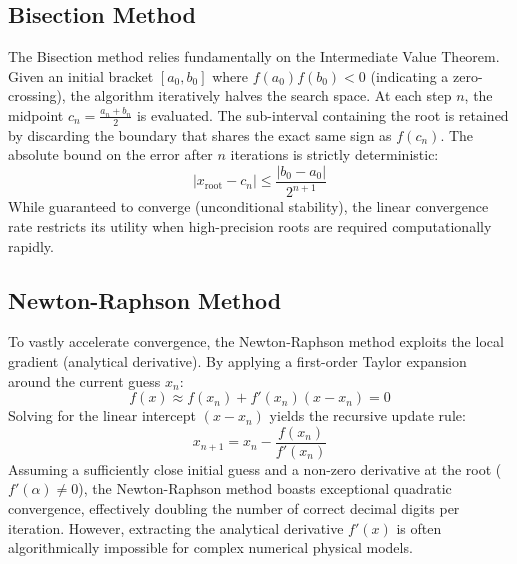 \documentclass[aps, reprint, twocolumn, superscriptaddress, floatfix]{revtex4-2}
\begin{document}
\subsection{Bisection Method}
The Bisection method relies fundamentally on the Intermediate Value Theorem. Given an initial bracket $[a_0, b_0]$ where $f(a_0)f(b_0) < 0$ (indicating a zero-crossing), the algorithm iteratively halves the search space. At each step $n$, the midpoint $c_n = \frac{a_n + b_n}{2}$ is evaluated. The sub-interval containing the root is retained by discarding the boundary that shares the exact same sign as $f(c_n)$. The absolute bound on the error after $n$ iterations is strictly deterministic:
\begin{equation}
    |x_{\text{root}} - c_n| \leq \frac{|b_0 - a_0|}{2^{n+1}}
\end{equation}
While guaranteed to converge (unconditional stability), the linear convergence rate restricts its utility when high-precision roots are required computationally rapidly.

\subsection{Newton-Raphson Method}
To vastly accelerate convergence, the Newton-Raphson method exploits the local gradient (analytical derivative). By applying a first-order Taylor expansion around the current guess $x_n$:
\begin{equation}
    f(x) \approx f(x_n) + f'(x_n)(x - x_n) = 0
\end{equation}
Solving for the linear intercept $(x - x_n)$ yields the recursive update rule:
\begin{equation}
    x_{n+1} = x_n - \frac{f(x_n)}{f'(x_n)}
\end{equation}
Assuming a sufficiently close initial guess and a non-zero derivative at the root ($f'(\alpha) \neq 0$), the Newton-Raphson method boasts exceptional quadratic convergence, effectively doubling the number of correct decimal digits per iteration. However, extracting the analytical derivative $f'(x)$ is often algorithmically impossible for complex numerical physical models.
\end{document}
